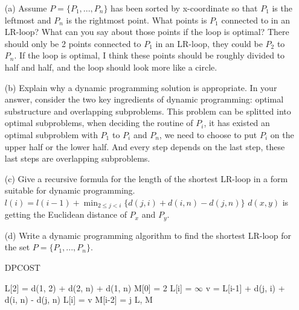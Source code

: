\documentclass{article}       %
\begin{document}
\begin{enumerate}
	\begin{enumerate}
		\item[(a)] Assume $P=\{P_1, ..., P_n\}$ has been sorted by x-coordinate so that $P_1$ is the leftmost and $P_n$ is the rightmost point. What points is $P_1$ connected to in an LR-loop? What can you say about those points if the loop is optimal?\newline\newline
		There should only be 2 points connected to $P_1$ in an LR-loop, they could be $P_2$ to $P_n$. If the loop is optimal, I think these points should be roughly divided to half and half, and the loop should look more like a circle.\newline
		\item[(b)] Explain why a dynamic programming solution is appropriate. In your answer, consider the two key ingredients of dynamic programming: optimal substructure and overlapping subproblems.\newline\newline
		This problem can be splitted into optimal subproblems, when deciding the routine of $P_i$, it has existed an optimal subproblem with $P_1$ to $P_i$ and $P_n$, we need to choose to put $P_i$ on the upper half or the lower half. And every step depends on the last step, these last steps are overlapping subproblems.\newline
		\item[(c)] Give a recursive formula for the length of the shortest LR-loop in a form suitable for dynamic programming.\newline\newline
		$l(i) = l(i-1) + \min_{2\leq j < i} \{d(j, i) + d(i, n) - d(j, n)\}$\newline
		$d(x, y)$ is getting the Euclidean distance of $P_x$ and $P_y$.\newline
		\item[(d)] Write a dynamic programming algorithm to find the shortest LR-loop for the set $P = \{P_1, ..., P_n\}$.
		\begin{algorithm}[H]
			\caption{DPCOST}
			\small
			\begin{algorithmic}[1]
				\State L[2] = d(1, 2) + d(2, n) + d(1, n)
				\State M[0] = 2
				\State L[i] = $\infty$
				\State v = L[i-1] + d(j, i) + d(i, n) - d(j, n)
				\State L[i] = v
				\State M[i-2] = j
				\EndIf
				\EndFor
				\EndFor
				\State \Return L, M
				\EndProcedure
			\end{algorithmic}\label{p1}

\end{algorithm}
\end{enumerate}
\end{enumerate}
\end{document}

